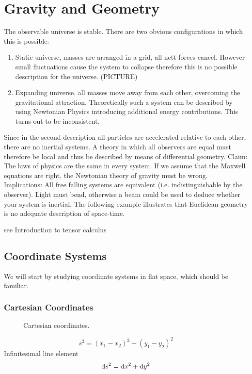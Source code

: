 \chapter{Gravity and Geometry}
The observable universe is stable. There are two obvious configurations in which this is possible:
\begin{enumerate}
    \item Static universe, masses are arranged in a grid, all nett forces cancel.
    However small fluctuations cause the system to collapse therefore this is
    no possible description for the universe. (PICTURE)
    \item Expanding universe, all masses move away from each other, overcoming the gravitational attraction.
    Theoretically such a system can be described by using Newtonian Physics introducing additional energy contributions.
    This turns out to be inconsistent.
\end{enumerate}
Since in the second description all particles are accelerated relative to each other, there are no inertial systems.
A theory in which all observers are equal must therefore be local and thus be described by means of differential geometry.
Claim: The laws of physics are the same in every system.
If we assume that the Maxwell equations are right, the Newtonian theory of
gravity must be wrong.
Implications:
All free falling systems are equivalent (i.e. indistinguishable by the observer).
Light must bend, otherwise a beam could be used to deduce whether your system is inertial.
The following example illustrates that Euclidean geometry is no adequate description of space-time.
\begin{example}
see Introduction to tensor calculus
\end{example}
\section{Coordinate Systems}
We will start by studying coordinate systems in flat space, which should be
familiar.
\subsection*{Cartesian Coordinates}
\begin{figure}[htb]
    \begin{center}
    \end{center}
    \caption{Cartesian coordinates.}
\end{figure}
\begin{equation}
    s^2=(x_1-x_2)^2+(y_1-y_2)^2
\end{equation}
Infinitesimal line element
\begin{equation}
    \dif s^2=\dif x^2+\dif y^2  \label{eq:cartline}
\end{equation}
